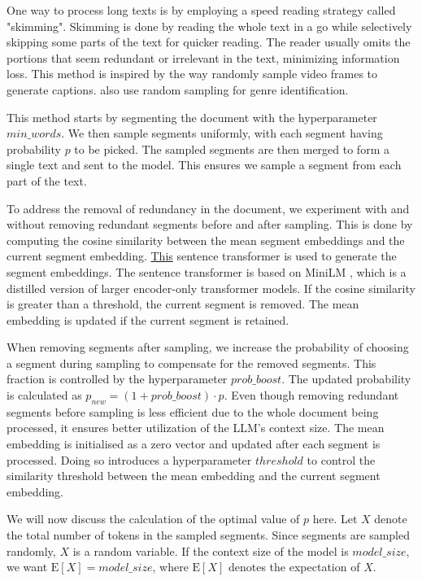 		One way to process long texts is by employing a speed reading strategy called "skimming".
		Skimming is done by reading the whole text in a go while selectively skipping some parts of the
		text for quicker reading.
		The reader usually omits the portions that seem redundant or irrelevant in the text, minimizing
		information loss.
		This method is inspired by the way \cite{wang2024videoagent} randomly sample video frames to
		generate captions.
		\citet{worsham-kalita-2018-genre} also use random sampling for genre identification.

		This method starts by segmenting the document with the hyperparameter $min\_words$.
		We then sample segments uniformly, with each segment having probability $p$ to be picked.
		The sampled segments are then merged to form a single text and sent to the model.
		This ensures we sample a segment from each part of the text.

		To address the removal of redundancy in the document, we experiment with and without removing
		redundant segments before and after sampling.
		This is done by computing the cosine similarity between the mean segment embeddings and the
		current segment embedding.
		\href{https://huggingface.co/sentence-transformers/all-MiniLM-L6-v2}{This} sentence transformer
		is used to generate the segment embeddings.
		The sentence transformer is based on MiniLM \cite{wang2020minilm}, which is a distilled version
		of larger encoder-only transformer models.
		If the cosine similarity is greater than a threshold, the current segment is removed.
		The mean embedding is updated if the current segment is retained.

		When removing segments after sampling, we increase the probability of choosing a segment during
		sampling to compensate for the removed segments.
		This fraction is controlled by the hyperparameter $prob\_boost$.
		The updated probability is calculated as $p_{new} = (1 + prob\_boost) \cdot p$.
		Even though removing redundant segments before sampling is less efficient due to the whole document
		being processed, it ensures better utilization of the LLM's context size.
		The mean embedding is initialised as a zero vector and updated after each segment is processed.
		Doing so introduces a hyperparameter $threshold$ to control the similarity threshold between the
		mean embedding and the current segment embedding.

		We will now discuss the calculation of the optimal value of $p$ here.
		Let $X$ denote the total number of tokens in the sampled segments.
		Since segments are sampled randomly, $X$ is a random variable.
		If the context size of the model is $model\_size$, we want $\mathrm{E}[X] = model\_size$,
		where $\mathrm{E}[X]$ denotes the expectation of $X$.

